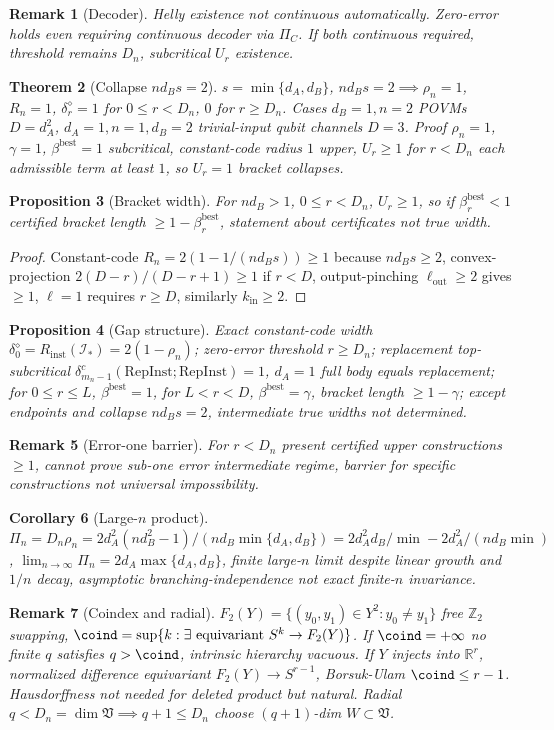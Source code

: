 \documentclass[11pt,a4paper]{article}
\newtheorem{theorem}{Theorem}[section]
\newtheorem{proposition}[theorem]{Proposition}
\newtheorem{corollary}[theorem]{Corollary}
\newtheorem{remark}[theorem]{Remark}
\newcommand{\RepInst}{\mathrm{RepInst}}
\begin{document}
\begin{remark}[Decoder]
Helly existence not continuous automatically. Zero-error holds even requiring continuous decoder via $\Pi_C$. If both continuous required, threshold remains $D_n$, subcritical $U_r$ existence.
\end{remark}
\begin{theorem}[Collapse $nd_Bs=2$]
$s=\min\{d_A,d_B\}$, $nd_Bs=2\implies\rho_n=1$, $R_n=1$, $\delta_r^\diamond=1$ for $0\le r<D_n$, $0$ for $r\ge D_n$. Cases $d_B=1,n=2$ POVMs $D=d_A^2$, $d_A=1,n=1,d_B=2$ trivial-input qubit channels $D=3$. Proof $\rho_n=1$, $\gamma=1$, $\beta^{\mathrm{best}}=1$ subcritical, constant-code radius $1$ upper, $U_r\ge1$ for $r<D_n$ each admissible term at least $1$, so $U_r=1$ bracket collapses.
\end{theorem}
\begin{proposition}[Bracket width]
For $nd_B>1$, $0\le r<D_n$, $U_r\ge1$, so if $\beta_r^{\mathrm{best}}<1$ certified bracket length $\ge1-\beta_r^{\mathrm{best}}$, statement about certificates not true width.
\end{proposition}
\begin{proof}
Constant-code $R_n=2(1-1/(nd_Bs))\ge1$ because $nd_Bs\ge2$, convex-projection $2(D-r)/(D-r+1)\ge1$ if $r<D$, output-pinching $\ell_{\mathrm{out}}\ge2$ gives $\ge1$, $\ell=1$ requires $r\ge D$, similarly $k_{\mathrm{in}}\ge2$.
\end{proof}
\begin{proposition}[Gap structure]
Exact constant-code width $\delta_0^\diamond=R_{\mathrm{inst}}(\mathcal I_*)=2(1-\rho_n)$; zero-error threshold $r\ge D_n$; replacement top-subcritical $\delta^c_{m_n-1}(\RepInst;\RepInst)=1$, $d_A=1$ full body equals replacement; for $0\le r\le L$, $\beta^{\mathrm{best}}=1$, for $L<r<D$, $\beta^{\mathrm{best}}=\gamma$, bracket length $\ge1-\gamma$; except endpoints and collapse $nd_Bs=2$, intermediate true widths not determined.
\end{proposition}
\begin{remark}[Error-one barrier]
For $r<D_n$ present certified upper constructions $\ge1$, cannot prove sub-one error intermediate regime, barrier for specific constructions not universal impossibility.
\end{remark}
\begin{corollary}[Large-$n$ product]
$\Pi_n=D_n\rho_n=2d_A^2(nd_B^2-1)/(nd_B\min\{d_A,d_B\})=2d_A^2d_B/\min-2d_A^2/(nd_B\min)$, $\lim_{n\to\infty}\Pi_n=2d_A\max\{d_A,d_B\}$, finite large-$n$ limit despite linear growth and $1/n$ decay, asymptotic branching-independence not exact finite-$n$ invariance.
\end{corollary}
\begin{remark}[Coindex and radial]
$F_2(Y)=\{(y_0,y_1)\in Y^2:y_0\neq y_1\}$ free $\mathbb Z_2$ swapping, $\coind=\sup\{k:\exists\text{ equivariant }S^k\to F_2(Y)\}$. If $\coind=+\infty$ no finite $q$ satisfies $q>\coind$, intrinsic hierarchy vacuous. If $Y$ injects into $\mathbb R^r$, normalized difference equivariant $F_2(Y)\to S^{r-1}$, Borsuk-Ulam $\coind\le r-1$. Hausdorffness not needed for deleted product but natural. Radial $q<D_n=\dim\mathfrak V\implies q+1\le D_n$ choose $(q+1)$-dim $W\subset\mathfrak V$.
\end{remark}
\end{document}
